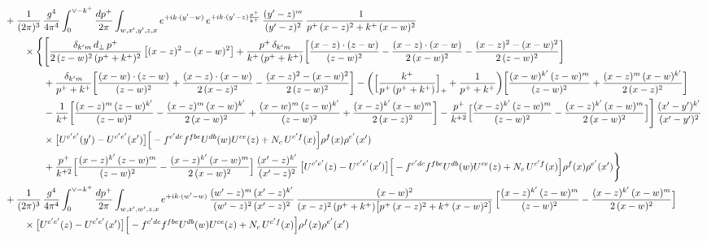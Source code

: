 \documentclass[10pt]{article}
\numberwithin{equation}{section}
\begin{document}
\begin{align}
&+\frac{1}{(2\pi)^{3}}\,\frac{g^{4}}{4\pi^{4}}\int_{0}^{\vee-k^{+}}\frac{dp^{+}}{2\pi}\int_{w,x^{\prime},y^{\prime},z,x}e^{+ik\cdot (y^{\prime}-w)}\,e^{+ik\cdot (y^{\prime}-z)\frac{p^{+}}{k^{+}}}\,\frac{(y^{\prime}-z)^{m}}{(y^{\prime}-z)^{2}}\,\frac{1}{p^{+}\,(x-z)^{2}+k^{+}\,(x-w)^{2}}\notag\\
&\qquad\times\Bigg\{\Bigg[\frac{\delta_{k^{\prime}m}\,d_{\perp}\,p^{+}}{2\,(z-w)^{2}\,(p^{+}+k^{+})^{2}}\left[(x-z)^{2}-(x-w)^{2}\right]+\frac{p^{+}\,\delta_{k^{\prime}m}}{k^{+}\,(p^{+}+k^{+})}\bigg[\frac{(x-z)\cdot(z-w)}{(z-w)^{2}}-\frac{(x-z)\cdot(x-w)}{2\,(x-w)^{2}}-\frac{(x-z)^{2}-(x-w)^{2}}{2\,(z-w)^{2}}\bigg]\notag\\
&\qquad\qquad+\frac{\delta_{k^{\prime}m}}{p^{+}+k^{+}}\bigg[\frac{(x-w)\cdot(z-w)}{(z-w)^{2}}+\frac{(x-z)\cdot(x-w)}{2\,(x-z)^{2}}-\frac{(x-z)^{2}-(x-w)^{2}}{2\,(z-w)^{2}}\bigg]
-\bigg(\Big[\frac{k^{+}}{p^{+}\,(p^{+}+k^{+})}\Big]_{+}+\frac{1}{p^{+}+k^{+}}\bigg)\bigg[\frac{(x-w)^{k^{\prime}}\,(z-w)^{m}}{(z-w)^{2}}+\frac{(x-z)^{m}\,(x-w)^{k^{\prime}}}{2\,(x-z)^{2}}\bigg]\notag\\
&\qquad\qquad-\frac{1}{k^{+}}\bigg[\frac{(x-z)^{m}\,(z-w)^{k^{\prime}}}{(z-w)^{2}}-\frac{(x-z)^{m}\,(x-w)^{k^{\prime}}}{2\,(x-w)^{2}}+\frac{(x-w)^{m}\,(z-w)^{k^{\prime}}}{(z-w)^{2}}+\frac{(x-z)^{k^{\prime}}\,(x-w)^{m}}{2\,(x-z)^{2}}\bigg]
-\frac{p^{+}}{k^{+2}}\Big[\frac{(x-z)^{k^{\prime}}\,(z-w)^{m}}{(z-w)^{2}}-\frac{(x-z)^{k^{\prime}}\,(x-w)^{m}}{2\,(x-w)^{2}}\Big]\Bigg]\,\frac{(x^{\prime}-y^{\prime})^{k^{\prime}}}{(x^{\prime}-y^{\prime})^{2}}\notag\\
&\qquad\qquad\times\big[U^{c^{\prime}e^{\prime}}(y^{\prime})-U^{c^{\prime}e^{\prime}}(x^{\prime})\big]\Big[-f^{c^{\prime}dc}f^{fbe}U^{db}(w)U^{ce}(z)+N_{c}\,U^{c^{\prime}f}(x)\Big]\rho^{f}(x)\rho^{e^{\prime}}(x^{\prime})\notag\\
&\qquad\qquad+\frac{p^{+}}{k^{+2}}\Big[\frac{(x-z)^{k^{\prime}}\,(z-w)^{m}}{(z-w)^{2}}-\frac{(x-z)^{k^{\prime}}\,(x-w)^{m}}{2\,(x-w)^{2}}\Big]\,\frac{(x^{\prime}-z)^{k^{\prime}}}{(x^{\prime}-z)^{2}}\,\big[U^{c^{\prime}e^{\prime}}(z)-U^{c^{\prime}e^{\prime}}(x^{\prime})\big]\Big[-f^{c^{\prime}dc}f^{fbe}U^{db}(w)U^{ce}(z)+N_{c}\,U^{c^{\prime}f}(x)\Big]\rho^{f}(x)\rho^{e^{\prime}}(x^{\prime})\Bigg\}\notag\\
&+\frac{1}{(2\pi)^{3}}\,\frac{g^{4}}{4\pi^{4}}\int_{0}^{\vee-k^{+}}\frac{dp^{+}}{2\pi}\int_{w,x^{\prime},w^{\prime},z,x}e^{+ik\cdot (w^{\prime}-w)}\,\frac{(w^{\prime}-z)^{m}\,(x^{\prime}-z)^{k^{\prime}}}{(w^{\prime}-z)^{2}\,(x^{\prime}-z)^{2}}\,\frac{(x-w)^{2}}{(x-z)^{2}\,(p^{+}+k^{+})\big[p^{+}\,(x-z)^{2}+k^{+}\,(x-w)^{2}\big]}\,\Big[\frac{(x-z)^{k^{\prime}}\,(z-w)^{m}}{(z-w)^{2}}-\frac{(x-z)^{k^{\prime}}\,(x-w)^{m}}{2\,(x-w)^{2}}\Big]\notag\\&\qquad\times\big[U^{c^{\prime}e^{\prime}}(z)-U^{c^{\prime}e^{\prime}}(x^{\prime})\big]\Big[-f^{c^{\prime}dc}f^{fbe}U^{db}(w)U^{ce}(z)+N_{c}\,U^{c^{\prime}f}(x)\Big]\rho^{f}(x)\rho^{e^{\prime}}(x^{\prime})\notag\\[6pt]

\end{align}
\end{document}
